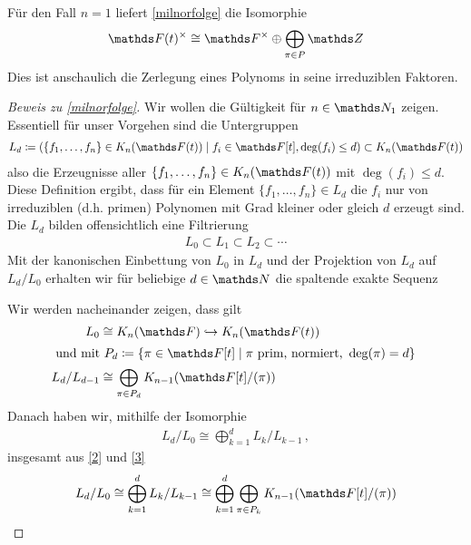 \documentclass[ngerman,fontsize=11pt, paper=a4, parskip=half, titlepage=true, toc=bib]{scrartcl}
\begin{document}
\begin{Bem}
  Für den Fall $n=1$ liefert \ref{milnorfolge} die Isomorphie
  \begin{gather*}
    \Ft^\times
    \cong \Fx
    \oplus\bigoplus_{\pi\in P}\Z
  \end{gather*}
  Dies ist anschaulich die Zerlegung eines
  Polynoms in seine irreduziblen Faktoren.
\end{Bem}
\begin{proof}[Beweis zu \ref{milnorfolge}]
  Wir wollen die Gültigkeit für $n\in\N_1$ zeigen.
  Essentiell für unser Vorgehen sind die Untergruppen
  \begin{gather*}
    L_d\coloneqq \left(
      \{f_1,\dotsc,f_n\}\in\KnFt 
      \mid f_i\in\F[t],\deg(f_i)\leq d
    \right)
    \subset\KnFt
  \end{gather*}
  also die Erzeugnisse aller $\{f_1,\dotsc,f_n\}\in\KnFt$ mit
  $\deg(f_i)\leq d$. 
  Diese Definition ergibt, dass für ein 
  Element $\{f_1,\dotsc,f_n\}\in L_d$ die $f_i$ nur von 
  irreduziblen (d.h. primen) Polynomen mit
  Grad kleiner oder gleich $d$ erzeugt sind.
  Die $L_d$ bilden offensichtlich eine Filtrierung
  \begin{gather*}
    L_0\subset L_1\subset L_2\subset \dotsb
  \end{gather*}
  Mit der kanonischen Einbettung von $L_0$ in $L_d$ und der Projektion
  von $L_d$ auf $L_d/L_0$ erhalten wir für
  beliebige $d\in\N$ die spaltende exakte Sequenz
  \begin{center}
  \end{center}
  Wir werden nacheinander zeigen, dass gilt
  \begin{align}
    L_0&\cong \KnF\hookrightarrow \KnFt  \label{1}\\
    \intertext{
    und mit $P_d\coloneqq \left\{
    \pi\in \F[t]\mid \pi\text{ prim, normiert, }\deg(\pi)=d
    \right\}$
    }
    L_d/L_{d-1}&\cong \bigoplus_{\pi\in P_d} \K_{n-1}(\Ftpi)\label{2}
  \end{align}
  Danach haben wir, mithilfe der Isomorphie
  \begin{gather} \label{3}
    L_d/L_0\cong \bigoplus_{k=1}^d L_k/L_{k-1} \,,
  \end{gather}
  insgesamt aus \ref{2} und \ref{3}
  \begin{align}\label{4}
    L_d/L_0
    \cong \bigoplus_{k=1}^d L_k/L_{k-1}
    \cong \bigoplus_{k=1}^d\bigoplus_{\pi\in P_k} \K_{n-1}(\Ftpi)

\end{align}
\end{proof}
\end{document}
